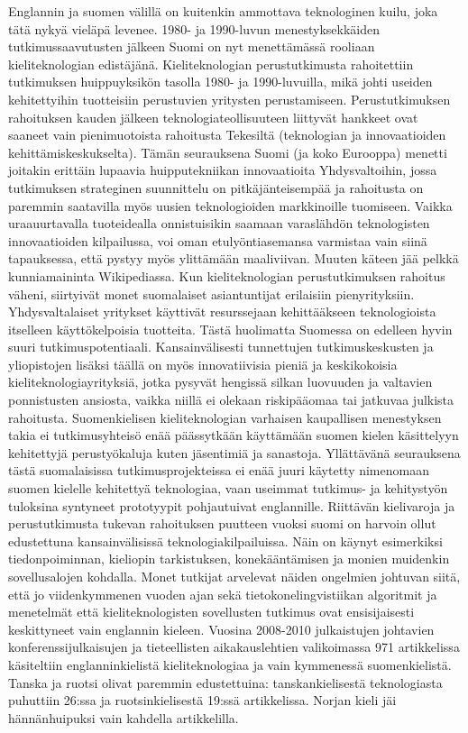 \begin{multicols}{2}
Englannin ja suomen välillä on kuitenkin ammottava teknologinen kuilu, joka tätä nykyä vieläpä levenee. 1980- ja 1990-luvun menestyksekkäiden tutkimussaavutusten jälkeen Suomi on nyt menettämässä rooliaan kieliteknologian edistäjänä. Kieliteknologian perustutkimusta rahoitettiin tutkimuksen huippuyksikön tasolla 1980- ja 1990-luvuilla, mikä johti useiden kehitettyihin tuotteisiin perustuvien yritysten perustamiseen.
Perustutkimuksen rahoituksen kauden jälkeen teknologiateollisuuteen liittyvät hankkeet ovat saaneet vain pienimuotoista rahoitusta Tekesiltä (teknologian ja innovaatioiden kehittämiskeskukselta). Tämän seurauksena Suomi (ja koko Eurooppa) menetti joitakin erittäin lupaavia huipputekniikan innovaatioita Yhdysvaltoihin, jossa tutkimuksen strateginen suunnittelu on pitkäjänteisempää ja rahoitusta on paremmin saatavilla myös uusien teknologioiden markkinoille tuomiseen. Vaikka uraauurtavalla tuoteidealla onnistuisikin saamaan varaslähdön teknologisten innovaatioiden kilpailussa, voi oman etulyöntiasemansa varmistaa vain siinä tapauksessa, että pystyy myös ylittämään maaliviivan.  Muuten käteen jää pelkkä kunniamaininta Wikipediassa.
Kun kieliteknologian perustutkimuksen rahoitus väheni, siirtyivät monet suomalaiset asiantuntijat erilaisiin pienyrityksiin. Yhdysvaltalaiset yritykset käyttivät resurssejaan kehittääkseen teknologioista itselleen käyttökelpoisia tuotteita. Tästä huolimatta Suomessa on edelleen hyvin suuri tutkimuspotentiaali. Kansainvälisesti tunnettujen tutkimuskeskusten ja yliopistojen lisäksi täällä on myös innovatiivisia pieniä ja keskikokoisia kieliteknologiayrityksiä, jotka pysyvät hengissä silkan luovuuden ja valtavien ponnistusten ansiosta, vaikka niillä ei olekaan riskipääomaa tai jatkuvaa julkista rahoitusta.
Suomenkielisen kieliteknologian varhaisen kaupallisen menestyksen takia ei tutkimusyhteisö enää päässytkään käyttämään suomen kielen käsittelyyn kehitettyjä perustyökaluja kuten jäsentimiä ja sanastoja. Yllättävänä seurauksena tästä suomalaisissa tutkimusprojekteissa ei enää juuri käytetty nimenomaan suomen kielelle kehitettyä teknologiaa, vaan useimmat tutkimus- ja kehitystyön tuloksina syntyneet prototyypit pohjautuivat englannille.
Riittävän kielivaroja ja perustutkimusta tukevan rahoituksen puutteen vuoksi suomi on harvoin ollut edustettuna kansainvälisissä teknologiakilpailuissa. Näin on käynyt esimerkiksi tiedonpoiminnan, kieliopin tarkistuksen, konekääntämisen ja monien muidenkin sovellusalojen kohdalla.
Monet tutkijat arvelevat näiden ongelmien johtuvan siitä, että jo viidenkymmenen vuoden ajan sekä tietokonelingvistiikan algoritmit ja menetelmät että kieliteknologisten sovellusten tutkimus ovat ensisijaisesti keskittyneet vain englannin kieleen. Vuosina 2008-2010 julkaistujen johtavien konferenssijulkaisujen ja tieteellisten aikakauslehtien valikoimassa 971 artikkelissa käsiteltiin englanninkielistä kieliteknologiaa ja vain kymmenessä suomenkielistä. Tanska ja ruotsi olivat paremmin edustettuina: tanskankielisestä teknologiasta puhuttiin 26:ssa ja ruotsinkielisestä 19:ssä artikkelissa. Norjan kieli jäi hännänhuipuksi vain kahdella artikkelilla.

\end{multicols}
